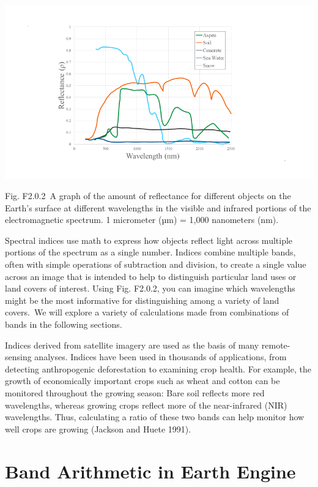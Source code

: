 \documentclass[
  letterpaper,
  DIV=11,
  numbers=noendperiod]{scrreprt}
\begin{document}
\includegraphics{./F2/image32.png}

Fig. F2.0.2~A graph of the amount of reflectance for different objects
on the Earth's surface at different wavelengths in the visible and
infrared portions of the electromagnetic spectrum. 1 micrometer (µm) =
1,000 nanometers (nm).

Spectral indices use math to express how objects reflect light across
multiple portions of the spectrum as a single number. Indices combine
multiple bands, often with simple operations of subtraction and
division, to create a single value across an image that is intended to
help to distinguish particular land uses or land covers of interest.
Using Fig. F2.0.2, you can imagine which wavelengths might be the most
informative for distinguishing among a variety of land covers.~We will
explore a variety of calculations made from combinations of bands in the
following sections.

Indices derived from satellite imagery are used as the basis of many
remote-sensing analyses. Indices have been used in thousands of
applications, from detecting anthropogenic deforestation to examining
crop health. For example, the growth of economically important crops
such as wheat and cotton can be monitored throughout the growing season:
Bare soil reflects more red wavelengths, whereas growing crops reflect
more of the near-infrared (NIR) wavelengths. Thus, calculating a ratio
of these two bands can help monitor how well crops are growing (Jackson
and Huete 1991).

\hypertarget{band-arithmetic-in-earth-engine}{%
\section{Band Arithmetic in Earth
Engine}\label{band-arithmetic-in-earth-engine}}
\end{document}
